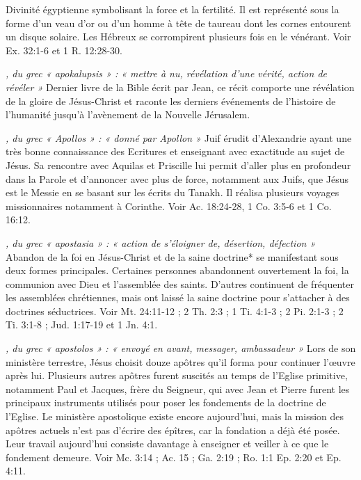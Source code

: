 \begin{multicols}{2}
\textit{}\newline
Divinité égyptienne symbolisant la force et la fertilité. Il est représenté sous la forme d'un veau d'or ou d'un homme à tête de taureau dont les cornes entourent un disque solaire. Les Hébreux se corrompirent plusieurs fois en le vénérant. Voir Ex. 32:1-6 et 1 R. 12:28-30.

\textit{, du grec « apokalupsis » : « mettre à nu, révélation d'une vérité, action de révéler »}\newline
Dernier livre de la Bible écrit par Jean, ce récit comporte une révélation de la gloire de Jésus-Christ et raconte les derniers événements de l'histoire de l'humanité jusqu'à l'avènement de la Nouvelle Jérusalem.

\textit{, du grec « Apollos » : « donné par Apollon »}\newline
Juif érudit d'Alexandrie ayant une très bonne connaissance des Ecritures et enseignant avec exactitude au sujet de Jésus. Sa rencontre avec Aquilas et Priscille lui permit d'aller plus en profondeur dans la Parole et d'annoncer avec plus de force, notamment aux Juifs, que Jésus est le Messie en se basant sur les écrits du Tanakh. Il réalisa plusieurs voyages missionnaires notamment à Corinthe. Voir Ac. 18:24-28, 1 Co. 3:5-6 et 1 Co. 16:12.

\textit{, du grec « apostasia » : « action de s'éloigner de, désertion, défection »}\newline
Abandon de la foi en Jésus-Christ et de la saine doctrine* se manifestant sous deux formes principales. Certaines personnes abandonnent ouvertement la foi, la communion avec Dieu et l'assemblée des saints. D'autres continuent de fréquenter les assemblées chrétiennes, mais ont laissé la saine doctrine pour s'attacher à des doctrines séductrices. Voir Mt. 24:11-12 ; 2 Th. 2:3 ; 1 Ti. 4:1-3 ; 2 Pi. 2:1-3 ; 2 Ti. 3:1-8 ; Jud. 1:17-19 et 1 Jn. 4:1.

\textit{, du grec « apostolos » : « envoyé en avant, messager, ambassadeur »}\newline
Lors de son ministère terrestre, Jésus choisit douze apôtres qu'il forma pour continuer l'œuvre après lui. Plusieurs autres apôtres furent suscités au temps de l'Eglise primitive, notamment Paul et Jacques, frère du Seigneur, qui avec Jean et Pierre furent les principaux instruments utilisés pour poser les fondements de la doctrine de l'Eglise. Le ministère apostolique existe encore aujourd'hui, mais la mission des apôtres actuels n'est pas d'écrire des épîtres, car la fondation a déjà été posée. Leur travail aujourd'hui consiste davantage à enseigner et veiller à ce que le fondement demeure. Voir Mc. 3:14 ; Ac. 15 ; Ga. 2:19 ; Ro. 1:1 Ep. 2:20 et Ep. 4:11.


\end{multicols}
